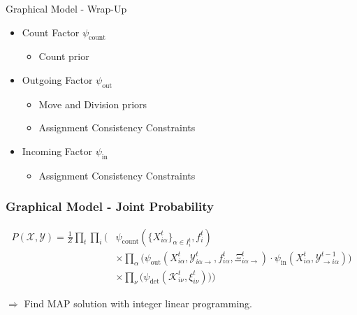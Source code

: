 \begin{frame}{Graphical Model - Wrap-Up}
\begin{itemize}
\begin{itemize}
\begin{itemize}
                \end{itemize}
                  \item[\usebox{\countFac}] Count Factor $\psi_{\text{count}}$
                \begin{itemize}
                      \item[] Count prior
                \end{itemize}
                  \item[\usebox{\outFac}] Outgoing Factor $\psi_{\text{out}}$
                \begin{itemize}
                      \item[] Move and Division priors
                      \item[] Assignment Consistency Constraints
                \end{itemize}
                  \item[\usebox{\inFac}] Incoming Factor $\psi_{\text{in}}$
                \begin{itemize}
                      \item[] Assignment Consistency Constraints
                \end{itemize}
        \end{itemize}
    \end{itemize}
\end{frame}

\begin{frame}[shrink=25]
    \frametitle{Graphical Model - Joint Probability}
    \begin{align*}
        P(\mathcal{X},\mathcal{Y}) = \frac{1}{Z}\prod_t\prod_i
        \Bigg(&\psi_{\text{count}}(\{X_{i\alpha}^t\}_{\alpha \in I_i^t},f_{i}^t) \\ \nonumber
        &\times\prod_{\alpha}\Big(\psi_{\mathrm{out}}(X_{i\alpha}^t, \mathcal{Y}_{i\alpha\rightarrow}^{t},
        f_{i\alpha}^t, \Xi_{i\alpha\rightarrow}^{t}) \cdot \psi_{\mathrm{in}}(X_{i\alpha}^{t},
        \mathcal{Y}_{\rightarrow i\alpha}^{t-1})\Big) \\ \nonumber
        &\times\prod_{\nu}\Big(\psi_{\text{det}}(\mathcal{K}_{i\nu}^t, \xi_{i\nu}^t)\Big)\Bigg)
    \end{align*}
    \vspace{10pt}
    \begin{center}
        \Large{$\Rightarrow$ Find MAP solution with integer linear programming.}
    \end{center}
\end{frame}


